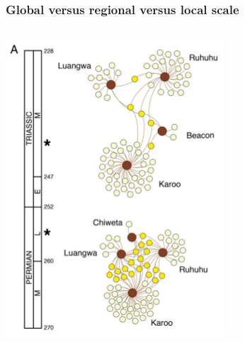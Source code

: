 \documentclass{beamer}
\begin{document}
\begin{frame}
  \frametitle{Global versus regional versus local scale}

  \begin{columns}
    \begin{column}{0.55\textwidth}
      \includegraphics[height=0.7\textheight,width=\textwidth,keepaspectratio=true]{figure/permian}


\end{column}
\end{columns}
\end{frame}
\end{document}
